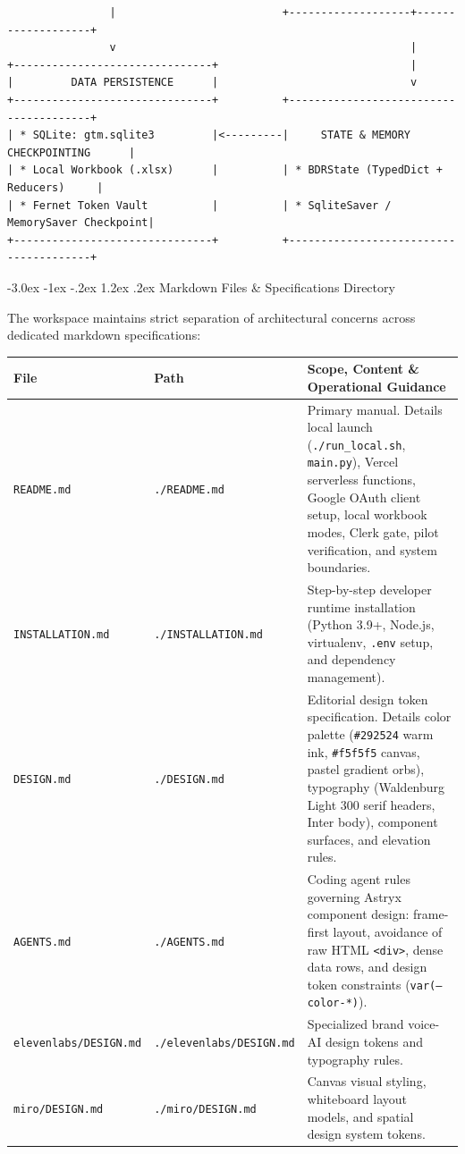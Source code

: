 \documentclass[10pt,letterpaper]{article}
\makeatletter
\renewcommand{\section}{\@startsection{section}{1}{\z@}%
  {-3.0ex \@plus -1ex \@minus -.2ex}%
  {1.2ex \@plus .2ex}%
  {\normalfont\large\bfseries\color{branddark}}}
\makeatother
\begin{document}
\begin{center}
\begin{minipage}{0.95\textwidth}
\begin{verbatim}
                |                          +-------------------+-------------------+
                v                                              |
+-------------------------------+                              |
|         DATA PERSISTENCE      |                              v
+-------------------------------+          +---------------------------------------+
| * SQLite: gtm.sqlite3         |<---------|     STATE & MEMORY CHECKPOINTING      |
| * Local Workbook (.xlsx)      |          | * BDRState (TypedDict + Reducers)     |
| * Fernet Token Vault          |          | * SqliteSaver / MemorySaver Checkpoint|
+-------------------------------+          +---------------------------------------+
\end{verbatim}
\end{minipage}
\end{center}

\section{Markdown Files \& Specifications Directory}

The workspace maintains strict separation of architectural concerns across dedicated markdown specifications:

\begin{table}[h!]
\centering
\scriptsize
\begin{tabularx}{\textwidth}{l p{3.2cm} X}
\toprule
\textbf{File} & \textbf{Path} & \textbf{Scope, Content \& Operational Guidance} \\
\midrule
\texttt{README.md} & \texttt{./README.md} & Primary manual. Details local launch (\texttt{./run\_local.sh}, \texttt{main.py}), Vercel serverless functions, Google OAuth client setup, local workbook modes, Clerk gate, pilot verification, and system boundaries. \\
\texttt{INSTALLATION.md} & \texttt{./INSTALLATION.md} & Step-by-step developer runtime installation (Python 3.9+, Node.js, virtualenv, \texttt{.env} setup, and dependency management). \\
\texttt{DESIGN.md} & \texttt{./DESIGN.md} & Editorial design token specification. Details color palette (\texttt{\#292524} warm ink, \texttt{\#f5f5f5} canvas, pastel gradient orbs), typography (Waldenburg Light 300 serif headers, Inter body), component surfaces, and elevation rules. \\
\texttt{AGENTS.md} & \texttt{./AGENTS.md} & Coding agent rules governing Astryx component design: frame-first layout, avoidance of raw HTML \texttt{<div>}, dense data rows, and design token constraints (\texttt{var(--color-*)}). \\
\texttt{elevenlabs/DESIGN.md} & \texttt{./elevenlabs/DESIGN.md} & Specialized brand voice-AI design tokens and typography rules. \\
\texttt{miro/DESIGN.md} & \texttt{./miro/DESIGN.md} & Canvas visual styling, whiteboard layout models, and spatial design system tokens. \\
\bottomrule
\end{tabularx}
\end{table}
\end{document}
